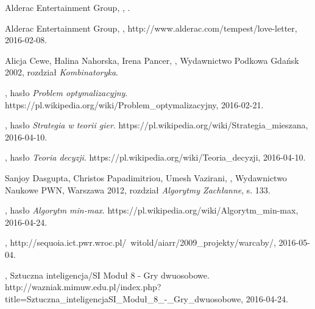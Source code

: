 \documentclass[11pt]{aghdpl}
\author{Damian Malarczyk}
\date{2015}
\begin{document}
\titlepages
\setcounter{tocdepth}{3}
\tableofcontents
\clearpage










\begin{thebibliography}{1}

\bibitem{}
\label{bib:loveLetterGame}
Alderac Entertainment Group,
,
.

\bibitem{}
\label{bib:loveLetterWebsite}
Alderac Entertainment Group,
,
\newblock http://www.alderac.com/tempest/love-letter, 2016-02-08.

\bibitem{}
\label{bib:tabliceMatematyczne}
Alicja Cewe, Halina Nahorska, Irena Pancer,
,
\newblock Wydawnictwo Podkowa Gdańsk 2002,
\newblock rozdział {\em Kombinatoryka}.

\bibitem{}
\label{bib:wiki_ProblemOptymalizacyjny}
, hasło {\em Problem optymalizacyjny}.
\newblock https://pl.wikipedia.org/wiki/Problem\_optymalizacyjny, 2016-02-21.

\bibitem{}
\label{bib:wiki_StrategiaTeoriaGier}
, hasło {\em Strategia w teorii gier}.
\newblock https://pl.wikipedia.org/wiki/Strategia\_mieszana, 2016-04-10.

\bibitem{}
\label{bib:wiki_TeoriaDecyzji}
, hasło {\em Teoria decyzji}.
\newblock https://pl.wikipedia.org/wiki/Teoria\_decyzji, 2016-04-10.

\bibitem{}
\label{bib:algorytmy_zachlanny}
Sanjoy Dasgupta, Christos Papadimitriou, Umesh Vazirani,
,
\newblock Wydawnictwo Naukowe PWN, Warszawa 2012,
\newblock rozdział {\em Algorytmy Zachłanne}, s. 133.

\bibitem{}
\label{bib:wiki_minMax}
, hasło {\em Algorytm min-max}.
\newblock https://pl.wikipedia.org/wiki/Algorytm\_min-max, 2016-04-24.


\bibitem{}
\label{bib:minMax_warcaby}
,
\newblock http://sequoia.ict.pwr.wroc.pl/~witold/aiarr/2009\_projekty/warcaby/, 2016-05-04.

\bibitem{}
\label{bib:wazniak_minMax}
, Sztuczna inteligencja/SI Moduł 8 - Gry dwuosobowe.
\newblock http://wazniak.mimuw.edu.pl/index.php?title=Sztuczna\_inteligencja\/SI\_Moduł\_8\_-\_Gry\_dwuosobowe, 2016-04-24.


\end{thebibliography}
\end{document}
